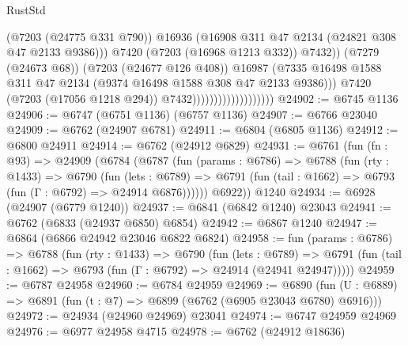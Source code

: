 \begin{lexlean}{RustStd}
\begin{coremodule}
                                                  (@7203 (@24775 @331 @790))
                                                  @16936
                                                  (@16908
                                                    @311
                                                    @47
                                                    @2134
                                                    (@24821 @308 @47 @2133 @9386)))
                                                @7420
                                                (@7203 (@16968 @1213 @332))
                                                @7432))
                                            (@7279 (@24673 @68))
                                            (@7203 (@24677 @126 @408))
                                            @16987
                                            (@7335
                                              @16498
                                              @1588
                                              @311
                                              @47
                                              @2134
                                              (@9374 @16498 @1588 @308 @47 @2133 @9386)))
                                          @7420
                                          (@7203 (@17056 @1218 @294))
                                          @7432)))))))))))))))))))
@24902 := @6745 @1136
@24906 := @6747 (@6751 @1136) (@6757 @1136)
@24907 := @6766 @23040
@24909 := @6762 (@24907 @6781)
@24911 := @6804 (@6805 @1136)
@24912 := @6800 @24911
@24914 := @6762 (@24912 @6829)
@24931 := @6761
    (fun (fn : @93) =>
    @24909
      (@6784
        (@6787
          (fun (params : @6786) =>
          @6788
            (fun (rty : @1433) =>
            @6790
              (fun (lets : @6789) =>
              @6791 (fun (tail : @1662) => @6793 (fun (Γ : @6792) => @24914 @6876))))))
        @6922))
    @1240
@24934 := @6928 (@24907 (@6779 @1240))
@24937 := @6841 (@6842 @1240) @23043
@24941 := @6762 (@6833 (@24937 @6850) @6854)
@24942 := @6867 @1240
@24947 := @6864 (@6866 @24942 @23046 @6822 @6824)
@24958 := fun (params : @6786) =>
  @6788
    (fun (rty : @1433) =>
    @6790
      (fun (lets : @6789) =>
      @6791 (fun (tail : @1662) => @6793 (fun (Γ : @6792) => @24914 (@24941 @24947)))))
@24959 := @6787 @24958
@24960 := @6784 @24959
@24969 := @6890
    (fun (U : @6889) => @6891 (fun (t : @7) => @6899 (@6762 (@6905 @23043 @6780) @6916)))
@24972 := @24934 (@24960 @24969) @23041
@24974 := @6747 @24959 @24969
@24976 := @6977 @24958 @4715
@24978 := @6762 (@24912 @18636)

\end{coremodule}
\end{lexlean}
